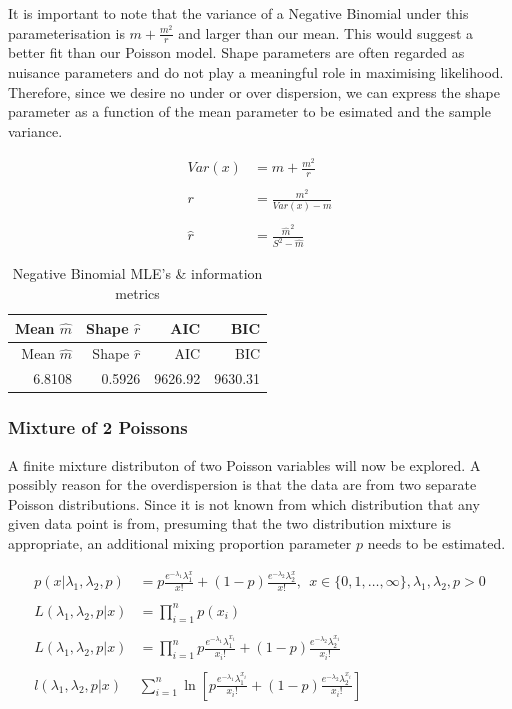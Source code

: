 \documentclass[11pt,preprint, authoryear]{elsarticle}
\numberwithin{equation}{section}
\numberwithin{figure}{section}
\numberwithin{table}{section}
\begin{document}
It is important to note that the variance of a Negative Binomial under
this parameterisation is \(m + \frac{m^2}{r}\) and larger than our mean.
This would suggest a better fit than our Poisson model. Shape parameters
are often regarded as nuisance parameters and do not play a meaningful
role in maximising likelihood. Therefore, since we desire no under or
over dispersion, we can express the shape parameter as a function of the
mean parameter to be esimated and the sample variance.

\begin{align*}
Var(x) &= m + \frac{m^2}{r} \\
\\
r &= \frac{m^2}{Var(x) - m} \\
\\
\hat{r} &= \frac{\hat{m}^2}{S^2 - \hat{m}}
\end{align*}

\begin{longtable}[]{@{}rrrr@{}}
\caption{Negative Binomial MLE's \& information metrics}\tabularnewline
\toprule
Mean \(\hat{m}\) & Shape \(\hat{r}\) & AIC & BIC\tabularnewline
\midrule
\endfirsthead
\toprule
Mean \(\hat{m}\) & Shape \(\hat{r}\) & AIC & BIC\tabularnewline
\midrule
\endhead
6.8108 & 0.5926 & 9626.92 & 9630.31\tabularnewline
\bottomrule
\end{longtable}

\subsubsection{Mixture of 2 Poissons}\label{mixture-of-2-poissons}

A finite mixture distributon of two Poisson variables will now be
explored. A possibly reason for the overdispersion is that the data are
from two separate Poisson distributions. Since it is not known from
which distribution that any given data point is from, presuming that the
two distribution mixture is appropriate, an additional mixing proportion
parameter \(p\) needs to be estimated.

\begin{align*} 
p(x|\lambda_1,\lambda_2,p) & =  p\frac{e^{-\lambda_1} \lambda_1^x}{x!} + (1-p)\frac{e^{-\lambda_2} \lambda_2^x}{x!},\ \ x\in \{0,1,\ldots,\infty\},\lambda_1 , \lambda_2 , p >0 \\
\\
L(\lambda_1,\lambda_2,p|x) & = \prod_{i=1}^n p(x_i) \\
\\
L(\lambda_1,\lambda_2,p|x) & =  \prod_{i=1}^n p\frac{e^{-\lambda_1} \lambda_1^{x_i}}{x_i!} + (1-p)\frac{e^{-\lambda_2} \lambda_2^{x_i}}{x_i!} \\
\\
l(\lambda_1,\lambda_2,p|x) & \sum^n_{i=1} \ln [ p\frac{e^{-\lambda_1} \lambda_1^{x_i}}{x_i!} + (1-p)\frac{e^{-\lambda_2} \lambda_2^{x_i}}{x_i!} ]
\end{align*}
\end{document}
